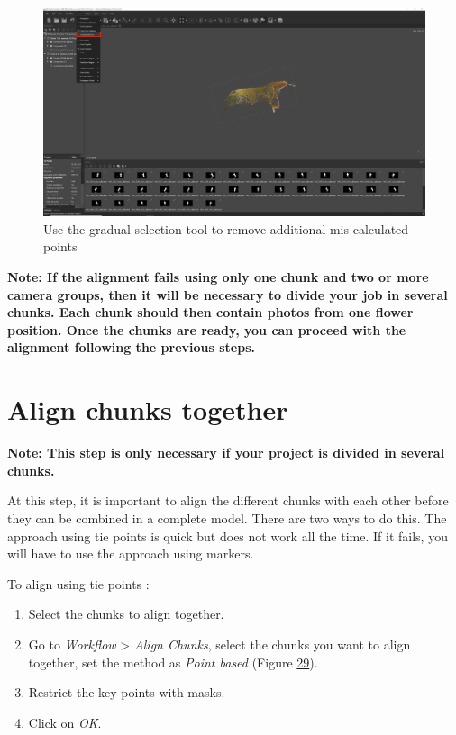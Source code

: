 \documentclass[
]{book}
\begin{document}
\begin{figure}
\hypertarget{model_orientation2}{%
\centering
\includegraphics[width=1\textwidth,height=\textheight]{Figures/metashape_gradual_selection.png}
\caption{Use the gradual selection tool to remove additional mis-calculated
points}\label{model_orientation2}
}
\end{figure}

\textbf{Note: If the alignment fails using only one chunk and two or more
camera groups, then it will be necessary to divide your job in several
chunks. Each chunk should then contain photos from one flower position.
Once the chunks are ready, you can proceed with the alignment following
the previous steps.}

\hypertarget{align-chunks-together}{%
\section{Align chunks together}\label{align-chunks-together}}

\textbf{Note: This step is only necessary if your project is divided in
several chunks.}

At this step, it is important to align the different chunks with each
other before they can be combined in a complete model. There are two
ways to do this. The approach using tie points is quick but does not
work all the time. If it fails, you will have to use the approach using
markers.

To align using tie points :

\begin{enumerate}
\def\labelenumi{\arabic{enumi}.}
\item
  Select the chunks to align together.
\item
  Go to \emph{Workflow} \textgreater{} \emph{Align Chunks}, select the chunks you want to
  align together, set the method as \emph{Point based} (Figure
  \protect\hyperlink{Align_chunk}{29}).
\item
  Restrict the key points with masks.
\item
  Click on \emph{OK}.
\end{enumerate}
\end{document}
